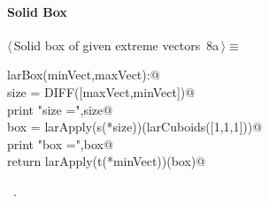 \documentclass[11pt,oneside]{article}	%
\begin{document}
\paragraph{Solid Box}
\begin{flushleft} \small \label{scrap14}
\protect{}$\langle\,$Solid box of given extreme vectors\nobreak\ {\footnotesize 8a}$\,\rangle\equiv$
\vspace{-1ex}
\begin{list}{}{} \item
\mbox{}\verb@def larBox(minVect,maxVect):@\\
\mbox{}\verb@   size = DIFF([maxVect,minVect])@\\
\mbox{}\verb@   print "size =",size@\\
\mbox{}\verb@   box = larApply(s(*size))(larCuboids([1,1,1]))@\\
\mbox{}\verb@   print "box =",box@\\
\mbox{}\verb@   return larApply(t(*minVect))(box)@\\
\mbox{}\verb@@{\NWsep}
\end{list}
\vspace{-1ex}
\footnotesize\addtolength{\baselineskip}{-1ex}
\begin{list}{}{\setlength{\itemsep}{-\parsep}\setlength{\itemindent}{-\leftmargin}}
\item \NWtxtMacroRefIn\ .
\end{list}
\end{flushleft}
\end{document}
